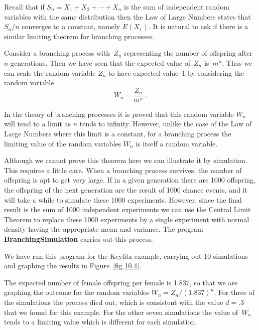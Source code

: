 \begin{example}
Recall that if $S_n = X_1 + X_2 +\cdots+ X_n$ is the sum of independent random
variables with the same distribution then the Law of Large Numbers states that
$S_n/n$ converges to a constant, namely $E(X_1)$.  It is natural to ask if
there is a similar limiting theorem for branching processes.

Consider a branching process with~$Z_n$ representing the number of offspring
after $n$ generations.  Then we have seen that the expected value of~$Z_n$
is~$m^n$.  Thus we can scale the random variable $Z_n$ to have expected value~1
by considering the random variable
$$
W_n = \frac{Z_n}{m^n}\ .
$$

In the theory of branching processes it is proved that this random variable
$W_n$ will tend to a limit as $n$ tends to infinity.  However, unlike the case
of the Law of Large Numbers where this limit is a constant, for a branching
process the limiting value of the random variables $W_n$ is itself a random
variable.

Although we cannot prove this theorem here we can illustrate it by simulation. 
This requires a little care.  When a branching process survives, the number of
offspring is apt to get very large.  If in a given generation there are 1000
offspring, the offspring of the next generation are the result of 1000 chance
events, and it will take a while to simulate these 1000 experiments.  However,
since the final result is the sum of 1000 independent experiments we can use
the Central Limit Theorem to replace these 1000 experiments by a single
experiment with normal density having the appropriate mean and variance.  The
program {\bf BranchingSimulation} carries out this process.
\par
We have run this program for the Keyfitz example, carrying out 10 simulations
and graphing the results in Figure~\ref{fig 10.4}.



The expected number of female offspring per female is 1.837, so that we are
graphing the outcome for the random variables $W_n = Z_n/(1.837)^n$.  For three
of the simulations the process died out, which is consistent with the value $d
= .3$ that we found for this example.  For the other seven simulations the
value of~$W_n$ tends to a limiting value which is different for each simulation.
\end{example}

